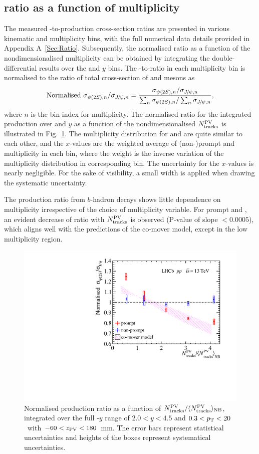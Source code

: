 \documentclass[12pt,a4paper]{article}
\begin{document}
\subsection{ ratio as a function of multiplicity}
The measured \psitwos-to-\jpsi production cross-section ratios are presented in various kinematic and multiplicity bins, with the full numerical data details provided in Appendix A~\ref{Sec:Ratio}. 
Subsequently, the normalised ratio as a function of the nondimensionalised multiplicity can be obtained by integrating the double-differential results over the \pt and $y$ bins. The \psitwos-to-\jpsi ratio in each multiplicity bin is normalised to the ratio of total cross-section of \jpsi and \psitwos mesons as
\begin{equation}
\mathrm{Normalised \ } \sigma_{{\psi{(2S)}},n}/\sigma_{{{J\mskip -3mu/\mskip -2mu\psi}},n}=\frac{\sigma_{{\psi{(2S)}},n}/\sigma_{{{J\mskip -3mu/\mskip -2mu\psi}},n}}{\sum_n\sigma_{{\psi{(2S)}},n}/\sum_n\sigma_{{{J\mskip -3mu/\mskip -2mu\psi}},n}},
\label{norm}
\end{equation}
where $n$ is the bin index for multiplicity.
The normalised ratio for the integrated production over \pt and $y$ as a function of the nondimensionalised $N_{\rm tracks}^{\rm PV}$ is illustrated in Fig.~\ref{Ratio}. The multiplicity distribution for \jpsi and \psitwos are quite similar to each other, and the $x$-values are the weighted average of (non-)prompt \jpsi and \psitwos multiplicity in each bin, where the weight is the inverse variation of the multiplicity distribution in corresponding bin. The uncertainty for the $x$-values is nearly negligible. For the sake of visibility, a small width is applied when drawing the systematic uncertainty.

The production ratio from $b$-hadron decays shows little dependence on multiplicity irrespective of the choice of multiplicity variable. For prompt \psitwos and \jpsi,  an evident decrease of ratio with $N_{\rm tracks}^{\rm PV}$ is observed (P-value of slope $<0.0005$), which aligns well with the predictions of the co-mover model, except in the low multiplicity region.
\begin{figure}[H]
    \begin{center}
      \includegraphics[width=0.6\linewidth]{pdf/Result/All.pdf}
    \end{center}
	\caption{Normalised production ratio as a function of $N_{\rm tracks}^{\rm PV}/\langle N_{\rm tracks}^{\rm PV}\rangle_{\rm{NB}}$, integrated over the full \pt-$y$ range of $2.0<y<4.5$ and $0.3<p_{\mathrm{T}}<20$~\gevc with $-60 < z_{\rm PV} < 180$~mm. The error bars represent statistical uncertainties and heights of the boxes represent systematical uncertainties. 
      }
    \label{Ratio}
\end{figure}
\end{document}
